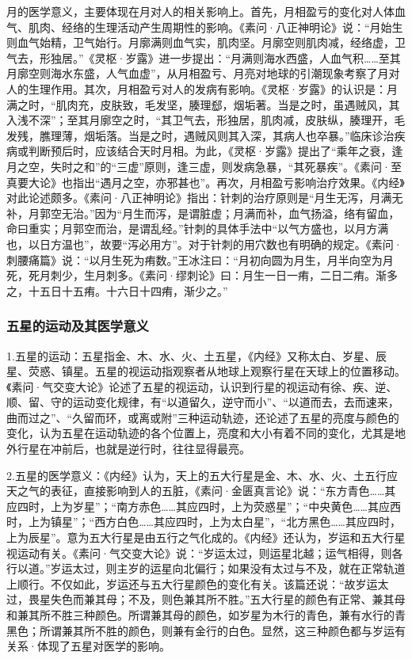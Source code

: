 \documentclass[draft,12pt]{ctexbook}
\begin{document}
月的医学意义，主要体现在月对人的相关影响上。首先，月相盈亏的变化对人体血气、肌肉、经络的生理活动产生周期性的影响。《素问·八正神明论》说：“月始生则血气始精，卫气始行。月廓满则血气实，肌肉坚。月廓空则肌肉减，经络虚，卫气去，形独居。”《灵枢·岁露》进一步提出：“月满则海水西盛，人血气积……至其月廓空则海水东盛，人气血虚”，从月相盈亏、月亮对地球的引潮现象考察了月对人的生理作用。其次，月相盈亏对人的发病有影响。《灵枢·岁露》的认识是：月满之时，“肌肉充，皮肤致，毛发坚，腠理郄，烟垢著。当是之时，虽遇贼风，其入浅不深”；至其月廓空之时，“其卫气去，形独居，肌肉减，皮肤纵，腠理开，毛发残，膲理薄，烟垢落。当是之时，遇贼风则其入深，其病人也卒暴。”临床诊治疾病或判断预后时，应该结合天时月相。为此，《灵枢·岁露》提出了“乘年之衰，逢月之空，失时之和”的“三虚”原则，逢三虚，则发病急暴，“其死暴疾”。《素问·至真要大论》也指出“遇月之空，亦邪甚也”。再次，月相盈亏影响治疗效果。《内经》对此论述颇多。《素问·八正神明论》指出：针刺的治疗原则是“月生无泻，月满无补，月郭空无治。”因为“月生而泻，是谓脏虚；月满而补，血气扬溢，络有留血，命曰重实；月郭空而治，是谓乱经。”针刺的具体手法中“以气方盛也，以月方满也，以日方温也”，故要“泻必用方”。对于针刺的用穴数也有明确的规定。《素问·刺腰痛篇》说：“以月生死为痏数。”王冰注曰：“月初向圆为月生，月半向空为月死，死月刺少，生月刺多。《素问·缪刺论》曰：月生一日一痏，二日二痏。渐多之，十五日十五痏。十六日十四痏，渐少之。”

\subsubsection{五星的运动及其医学意义}%

1.五星的运动：五星指金、木、水、火、土五星，《内经》又称太白、岁星、辰星、荧惑、镇星。五星的视运动指观察者从地球上观察行星在天球上的位置移动。《素问·气交变大论》论述了五星的视运动，认识到行星的视运动有徐、疾、逆、顺、留、守的运动变化规律，有“以道留久，逆守而小”、“以道而去，去而速来，曲而过之”、“久留而环，或离或附”三种运动轨迹，还论述了五星的亮度与颜色的变化，认为五星在运动轨迹的各个位置上，亮度和大小有着不同的变化，尤其是地外行星在冲前后，也就是逆行时，往往显得最亮。

2.五星的医学意义：《内经》认为，天上的五大行星是金、木、水、火、土五行应天之气的表征，直接影响到人的五脏，《素问·金匮真言论》说：“东方青色……其应四时，上为岁星”；“南方赤色……其应四时，上为荧惑星”；“中央黄色……其应西时，上为镇星”；“西方白色……其应四时，上为太白星”，“北方黑色……其应四时，上为辰星”。意为五大行星是由五行之气化成的。《内经》还认为，岁运和五大行星视运动有关。《素问·气交变大论》说：“岁运太过，则运星北越；运气相得，则各行以道。”岁运太过，则主岁的运星向北偏行；如果没有太过与不及，就在正常轨道上顺行。不仅如此，岁运还与五大行星颜色的变化有关。该篇还说：“故岁运太过，畏星失色而兼其母；不及，则色兼其所不胜。”五大行星的颜色有正常、兼其母和兼其所不胜三种颜色。所谓兼其母的颜色，如岁星为木行的青色，兼有水行的青黑色；所谓兼其所不胜的颜色，则兼有金行的白色。显然，这三种颜色都与岁运有关系·体现了五星对医学的影响。
\end{document}
